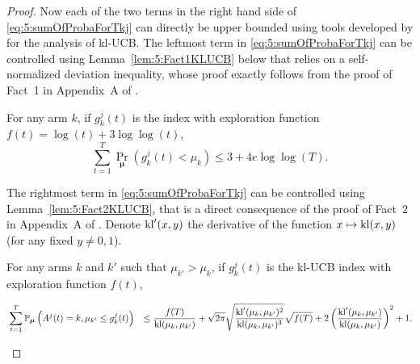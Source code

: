 \begin{proof}
  Now each of the two terms in the right hand side of \eqref{eq:5:sumOfProbaForTkj} can directly be upper bounded using tools developed by \cite{KLUCBJournal} for the analysis of kl-UCB.
  The leftmost term in \eqref{eq:5:sumOfProbaForTkj} can be controlled using Lemma~\ref{lem:5:Fact1KLUCB} below that relies on a self-normalized deviation inequality, whose proof exactly follows from the proof of Fact~1 in Appendix~A of \cite{KLUCBJournal}.

  \begin{lemma}\label{lem:5:Fact1KLUCB}
  \begin{leftbar}[lemmabar]  %
      For any arm $k$, if $g_k^{j}(t)$ is the \klUCB{} index with exploration function $f(t)=\log(t)+3\log\log(t)$,
      \begin{equation}
        \sum_{t=1}^T \Pr_{\bm{\mu}} \left(g_k^{j}(t) < \mu_k\right) \leq 3 + 4e \log\log(T).
      \end{equation}
  \end{leftbar}  %
  \end{lemma}

  The rightmost term in \eqref{eq:5:sumOfProbaForTkj} can be controlled using Lemma~\ref{lem:5:Fact2KLUCB}, that is a direct consequence of the proof of Fact~2 in Appendix~A of \cite{KLUCBJournal}.
  Denote $\mathrm{kl}'(x,y)$ the derivative of the function $x \mapsto \mathrm{kl}(x,y)$ (for any fixed $y\neq 0, 1$).

  \begin{lemma}\label{lem:5:Fact2KLUCB}
  \begin{leftbar}[lemmabar]  %
    For any arms $k$ and $k'$ such that $\mu_{k'} > \mu_{k}$, if $g_k^{j}(t)$ is the kl-UCB index with exploration function $f(t)$,
    \begin{small} %
      \begin{align*}
        &\sum_{t=1}^T\mathbb{P}_{\bm{\mu}} \left( A^j(t) = k, \mu_{k'} \leq g_k^{j}(t) \right) & \leq  \frac{f(T)}{\mathrm{kl}(\mu_k,\mu_{k'})}
        + \sqrt{2\pi} \sqrt{\frac{\mathrm{kl}'(\mu_k,\mu_{k'})^2}{\mathrm{kl}(\mu_k,\mu_{k'})^3}}\sqrt{f(T)} + 2\left(\frac{\mathrm{kl}'(\mu_k,\mu_{k'})}{\mathrm{kl}(\mu_k,\mu_{k'})}\right)^2 + 1.
      \end{align*}
    \end{small} %
\end{leftbar}  %
\end{lemma}


\end{proof}
